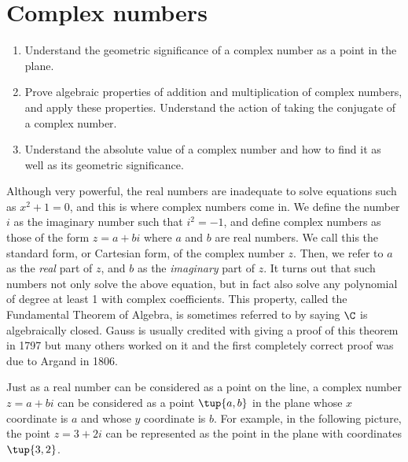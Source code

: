 \section{Complex numbers}

\begin{outcome}
  \begin{enumerate}
  \item Understand the geometric significance of a complex number as a
    point in the plane.
  \item Prove algebraic properties of addition and multiplication of
    complex numbers, and apply these properties. Understand the action
    of taking the conjugate of a complex number.
  \item Understand the absolute value of a complex number and how to
    find it as well as its geometric significance.
  \end{enumerate}
\end{outcome}

Although very powerful, the real numbers are inadequate to solve
equations such as $x^2+1=0$, and this is where complex numbers come
in. We define the number $i$ as the imaginary number such that $i^2 =
-1$, and define complex numbers as those of the form $z = a + bi$
where $a$ and $b$ are real numbers. We call this the standard form, or Cartesian form, of the complex number
$z$.
Then, we refer to $a$ as the
{\em real\em} part of $z$, and $b$ as the {\em imaginary\em} part of
$z$. It turns out that such numbers not only solve the above equation,
but in fact also solve any polynomial of degree at least 1 with complex coefficients. This property, called the Fundamental Theorem of Algebra, is sometimes referred to by saying $\C$ is
algebraically closed. Gauss is usually credited with giving a proof
of this theorem in 1797 but many others worked on it and the first
completely correct proof was due to Argand in 1806.

Just as a real number can be considered as a point on the line, a
complex number $z = a + bi$ can be considered as a point $\tup{
a,b} $ in the plane whose $x$ coordinate is $ a$ and whose $y$
coordinate is $b$. For example, in the following picture, the point $z
= 3+2i$ can be represented as the point in the plane with
coordinates $\tup{3,2}$.

\begin{center}
\end{center}


